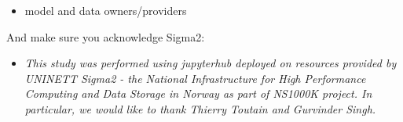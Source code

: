 \documentclass[10pt,parskip=half,
	toc=sectionentrywithdots,
	bibliography=totocnumbered,
	captions=tableheading,numbers=noendperiod]{scrartcl}
\providecommand{\tightlist}{%
  \setlength{\itemsep}{0pt}\setlength{\parskip}{0pt}}
\begin{document}
\begin{itemize}
\tightlist
\item
  model and data owners/providers
\end{itemize}

And make sure you acknowledge Sigma2:

\begin{itemize}
\tightlist
\item
  \emph{This study was performed using jupyterhub deployed on resources
  provided by UNINETT Sigma2 - the National Infrastructure for High
  Performance Computing and Data Storage in Norway as part of NS1000K
  project. In particular, we would like to thank Thierry Toutain and
  Gurvinder Singh.}
\end{itemize}

\begin{lstlisting}[language=Python,numbers=left,xleftmargin=20pt,xrightmargin=5pt,belowskip=5pt,aboveskip=5pt]

\end{lstlisting}




	
\end{document}

